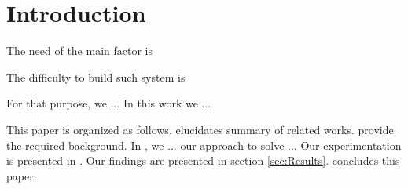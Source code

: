\section{Introduction} \label{sec:Introduction}

The need of the main factor is

The difficulty to build such system is 



For that purpose,
	we ...
In this work we ...

This paper is organized as follows.
 elucidates summary of related works.
 provide the required background.
In ,
	we ...
our approach to solve ...
Our experimentation is presented in .
Our findings are presented in section \ref{sec:Results}.
 concludes this paper.

